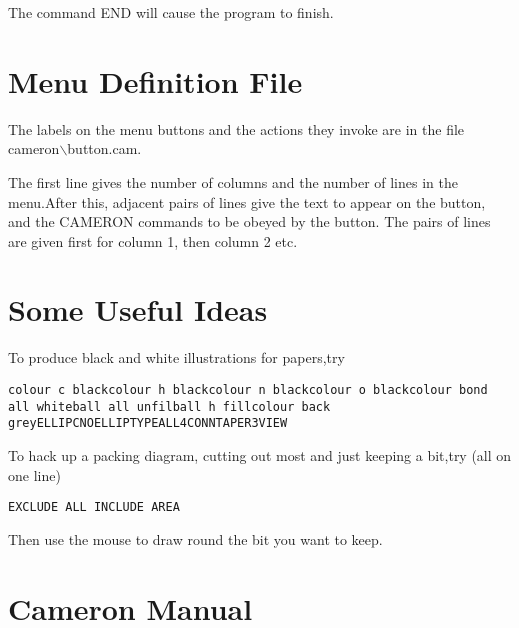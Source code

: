 \documentclass[10pt,a4paper]{report}
\begin{document}
\bigskip{}



The command END will cause the program to finish.\chapter{Menu Definition File}
The labels on the menu buttons and the actions they invoke are in the file cameron$\backslash$button.cam.

The first line gives the number of columns and the number of lines in the menu.After this, adjacent pairs of lines give the text to appear on the button, and the CAMERON commands to be obeyed by the button. The pairs of lines are given first for column 1, then column 2 etc.

\chapter{Some Useful Ideas}

To produce black and white illustrations for papers,try\small\begin{verbatim}colour c blackcolour h blackcolour n blackcolour o blackcolour bond all whiteball all unfilball h fillcolour back greyELLIPCNOELLIPTYPEALL4CONNTAPER3VIEW\end{verbatim}\normalsize



To hack up a packing diagram, cutting out most and just keeping a bit,try (all on one line)\small\begin{verbatim}EXCLUDE ALL INCLUDE AREA\end{verbatim}\normalsize

Then use the mouse to draw round the bit you want to keep.



\chapter{Cameron Manual}


 \small\begin{verbatim}\end{verbatim}\normalsize



\printindex
\end{document}
